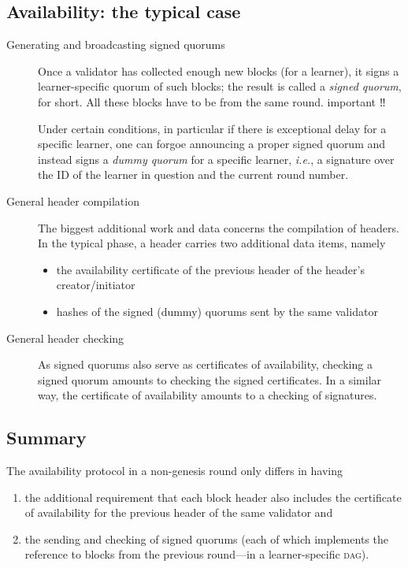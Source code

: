 \documentclass{article}
\theoremstyle{definition}
\newcommand{\tnote}[1]{
  \marginnote{\footnotesize #1}%
}
\newcommand{\DAG}[1][]{\textsc{dag}#1\xspace}
\newcommand{\ie}[1][]{\emph{i.e.}, }
\begin{document}
\subsection{Availability: the typical case}

\begin{description}
\item[Generating and broadcasting signed quorums]
  \tnote{primary \\⇒ primary}
  Once a validator has collected 
  enough new  blocks (for a learner), 
  it signs a learner-specific quorum of such blocks;
  the result is called a \emph{signed quorum},  
  for short. 
  All these blocks have to be from the same round. {\color{red} important ‼}

  Under certain conditions,
  in particular if there is exceptional delay for a specific learner,
  one can forgoe announcing a proper signed quorum
  and instead signs a \emph{dummy quorum} for a specific learner,
  \ie a signature over the ID of the learner in question and the current round number.  

\item[General header compilation]
  The biggest additional work and data
  concerns the compilation of headers.
  In the typical phase, 
  a header carries two additional data items, namely
  \begin{itemize}
  \item 
    the availability certificate of the previous header 
    of the header's creator/initiator
  \item 
    hashes of the signed (dummy) quorums sent by the same validator
  \end{itemize}

\item[General header checking]
  As signed quorums also serve as certificates of availability,
  checking a signed quorum amounts to checking the signed certificates.
  In a similar way,
  the certificate of availability amounts to a checking of signatures.
\end{description}


\subsection{Summary}
The availability protocol in a non-genesis round 
only differs in having
\begin{enumerate}
\item the additional requirement 
that each block header also includes 
the certificate of availability 
for the previous header of the same validator and 
\item 
the sending and checking of signed quorums
(each of which implements the reference to 
blocks from the previous round—in a learner-specific \DAG).
\end{enumerate}
\end{document}
